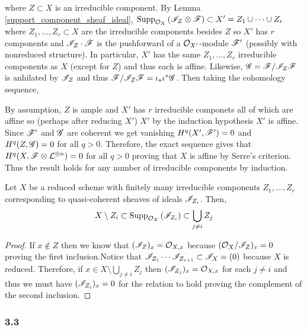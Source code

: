\documentclass[12pt]{article}
\begin{document}
where $Z \subset X$ is an irreducible component. By Lemma \ref{support_component_sheaf_ideal}, $\mathrm{Supp}_{\mathcal{O}_{X}}\left(\mathscr{I}_Z \otimes \mathscr{F} \right) \subset X' = Z_1 \cup \cdots \cup Z_r$ where $Z_1, \dots, Z_r \subset X$ are the irreducible components besides $Z$ so $X'$ has $r$ components and $\mathscr{I}_{Z} \cdot \mathscr{F}$ is the pushforward of a $\mathcal{O}_{X'}$-module $\mathscr{F}'$ (possibly with nonreduced structure). In particular, $X'$ has the same $Z_1, \dots, Z_r$ irreducible components as $X$ (except for $Z$) and thus each is affine. Likewise, $\mathscr{G} = \mathscr{F} / \mathscr{I}_Z \mathscr{F}$ is anhilated by $\mathscr{I}_Z$ and thus $\mathscr{F} / \mathscr{I}_Z \mathscr{F} = \iota_* \iota^* \mathscr{G}$. 
Then taking the cohomology sequence,
\begin{center}
\end{center}
By assumption, $Z$ is ample and $X'$ has $r$ irreducible componets all of which are affine so (perhaps after reducing $X'$) $X'$ by the induction hypothesis $X'$ is affine. Since $\mathscr{F}'$ and $\mathscr{G}$ are coherent we get vanishing $H^q(X', \mathscr{F}') = 0$ and $H^q(Z, \mathscr{G}) = 0$ for all $q > 0$.
Therefore, the exact sequence gives that $H^q(X, \mathscr{F} \otimes \mathcal{L}^{\otimes n}) = 0$ for all $q > 0$ proving that $X$ is affine by Serre's criterion. Thus the result holds for any number of irreducible components by induction.

\begin{lemma} \label{support_component_sheaf_ideal}
Let $X$ be a reduced scheme with finitely many irreducible components $Z_1, \dots, Z_r$ corresponding to quasi-coherent sheaves of ideals $\mathscr{I}_{Z_i}$. Then,
\[ X \setminus Z_i \subset \mathrm{Supp}_{\mathcal{O}_{X}}\left(\mathscr{I}_{Z_{i}} \right) \subset \bigcup_{j \neq i} Z_j \]
\end{lemma}

\begin{proof}
If $x \notin Z$ then we know that $(\mathscr{I}_Z)_x = \mathcal{O}_{X, x}$ because $(\mathcal{O}_{X}/\mathscr{I}_Z)_x = 0$ proving the first inclusion.Notice that $\mathscr{I}_{Z_1} \cdots \mathscr{I}_{Z_{r+1}} \subset \mathscr{I}_{X} = (0)$ because $X$ is reduced. Therefore, if $x \in X \setminus \bigcup_{j \neq i} Z_j$ then $(\mathscr{I}_{Z_j})_x = \mathcal{O}_{X, x}$ for each $j \neq i$ and thus we must have $(\mathscr{I}_{Z_i})_x = 0$ for the relation to hold proving the complement of the second inclusion.
\end{proof}

\subsubsection{3.3}
\end{document}
